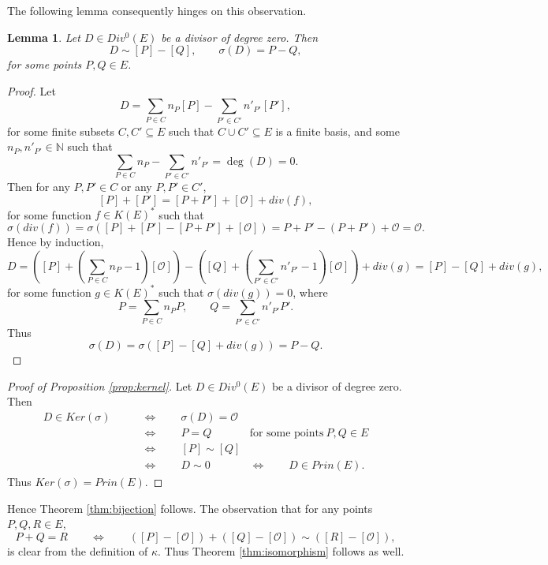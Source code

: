 \documentclass{article}
\theoremstyle{plain}
\newtheorem{lemma}[n]{Lemma}
\theoremstyle{definition}
\newcommand{\rb}[1]{\left( #1 \right)}
\renewcommand{\sb}[1]{\left[ #1 \right]}
\newcommand{\N}{\mathbb{N}}
\newcommand{\OO}{\mathcal{O}}
\begin{document}
The following lemma consequently hinges on this observation.

\begin{lemma}
Let $ D \in Div^0\rb{E} $ be a divisor of degree zero. Then
$$ D \sim \sb{P} - \sb{Q}, \qquad \sigma\rb{D} = P - Q, $$
for some points $ P, Q \in E $.
\end{lemma}

\begin{proof}
Let
$$ D = \sum_{P \in C} n_P\sb{P} - \sum_{P' \in C'} n'_{P'}\sb{P'}, $$
for some finite subsets $ C, C' \subseteq E $ such that $ C \cup C' \subseteq E $ is a finite basis, and some $ n_P, n'_{P'} \in \N $ such that
$$ \sum_{P \in C} n_P - \sum_{P' \in C'} n'_{P'} = \deg\rb{D} = 0. $$
Then for any $ P, P' \in C $ or any $ P, P' \in C' $,
$$ \sb{P} + \sb{P'} = \sb{P + P'} + \sb{\OO} + div\rb{f}, $$
for some function $ f \in K\rb{E}^* $ such that
$$ \sigma\rb{div\rb{f}} = \sigma\rb{\sb{P} + \sb{P'} - \sb{P + P'} + \sb{\OO}} = P + P' - \rb{P + P'} + \OO = \OO. $$
Hence by induction,
$$ D = \rb{\sb{P} + \rb{\sum_{P \in C} n_P - 1}\sb{\OO}} - \rb{\sb{Q} + \rb{\sum_{P' \in C'} n'_{P'} - 1}\sb{\OO}} + div\rb{g} = \sb{P} - \sb{Q} + div\rb{g}, $$
for some function $ g \in K\rb{E}^* $ such that $ \sigma\rb{div\rb{g}} = 0 $, where
$$ P = \sum_{P \in C} n_PP, \qquad Q = \sum_{P' \in C'} n'_{P'}P'. $$
Thus
$$ \sigma\rb{D} = \sigma\rb{\sb{P} - \sb{Q} + div\rb{g}} = P - Q. $$
\end{proof}

\begin{proof}[Proof of Proposition \ref{prop:kernel}]
Let $ D \in Div^0\rb{E} $ be a divisor of degree zero. Then
\begin{align*}
D \in Ker\rb{\sigma} \qquad
& \iff \qquad \sigma\rb{D} = \OO \\
& \iff \qquad P = Q & \text{for some points} \ P, Q \in E \\
& \iff \qquad \sb{P} \sim \sb{Q} \\
& \iff \qquad D \sim 0 & \iff \qquad D \in Prin\rb{E}.
\end{align*}
Thus $ Ker\rb{\sigma} = Prin\rb{E} $.
\end{proof}

Hence Theorem \ref{thm:bijection} follows. The observation that for any points $ P, Q, R \in E $,
$$ P + Q = R \qquad \iff \qquad \rb{\sb{P} - \sb{\OO}} + \rb{\sb{Q} - \sb{\OO}} \sim \rb{\sb{R} - \sb{\OO}}, $$
is clear from the definition of $ \kappa $. Thus Theorem \ref{thm:isomorphism} follows as well.
\end{document}
